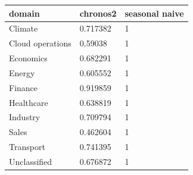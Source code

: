 \begin{tabular}{lll}
\toprule
domain & chronos2 & seasonal naive \\
\midrule
Climate & 0.717382 & 1 \\
Cloud operations & 0.59038 & 1 \\
Economics & 0.682291 & 1 \\
Energy & 0.605552 & 1 \\
Finance & 0.919859 & 1 \\
Healthcare & 0.638819 & 1 \\
Industry & 0.709794 & 1 \\
Sales & 0.462604 & 1 \\
Transport & 0.741395 & 1 \\
Unclassified & 0.676872 & 1 \\
\bottomrule
\end{tabular}
